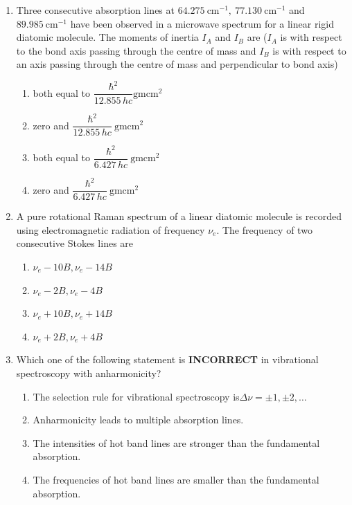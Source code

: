\documentclass[journal,12pt,onecolumn]{IEEEtran}
\theoremstyle{remark}
\begin{document}
\begin{enumerate}
\item Three consecutive absorption lines at $64.275\ \text{cm}^{-1},\ 77.130\ \text{cm}^{-1}$ and $89.985\ \text{cm}^{-1}$ have been observed in a microwave spectrum for a linear rigid diatomic molecule. The moments of inertia $I_A$ and $I_B$ are ($I_A$ is with respect to the bond axis passing through the centre of mass and $I_B$ is with respect to an axis passing through the centre of mass and perpendicular to bond axis)
\hfill{}
\begin{multicols}{2}
\begin{enumerate}
    \item both equal to $\dfrac{\hbar^2}{12.855\,h c} \mathrm{gmcm^2}$
    \item zero and $\dfrac{\hbar^2}{12.855\,h c}\ \mathrm{gmcm^2}$
    \item both equal to $\dfrac{\hbar^2}{6.427\,h c}\ \mathrm{gmcm^2}$
    \item zero and $\dfrac{\hbar^2}{6.427\,h c}\ \mathrm{gmcm^2}$
\end{enumerate}
\end{multicols}

\item A pure rotational Raman spectrum of a linear diatomic molecule is recorded using electromagnetic radiation of frequency $\nu_e$. The frequency of two consecutive Stokes lines are
\hfill{}
\begin{multicols}{2}
\begin{enumerate}
    \item $\nu_e - 10B, \nu_e - 14B$
    \item $\nu_e - 2B, \nu_e - 4B$
    \item $\nu_e + 10B, \nu_e + 14B$
    \item $\nu_e + 2B,\nu_e + 4B$
\end{enumerate}
\end{multicols}

  \item Which one of the following statement is \textbf{INCORRECT} in vibrational spectroscopy with anharmonicity?
  \hfill{}
\begin{multicols}{2}
\begin{enumerate}
    \item The selection rule for vibrational spectroscopy is$\Delta\nu=\pm1,\pm2,\dots$
    \item Anharmonicity leads to multiple absorption lines.
    \item The intensities of hot band lines are stronger than the fundamental absorption.
    \item The frequencies of hot band lines are smaller than the fundamental absorption.
\end{enumerate}
\end{multicols}


\end{enumerate}
\end{document}
